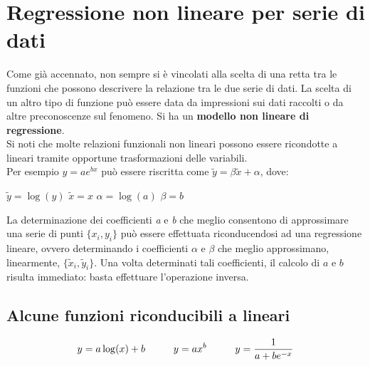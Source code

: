 \section{Regressione non lineare per serie di dati}
Come già accennato, non sempre si è vincolati alla scelta di una retta tra le funzioni che possono descrivere la relazione tra le due serie di dati. La scelta di un altro tipo di funzione può essere data da impressioni sui dati raccolti o da altre preconoscenze sul fenomeno. Si ha un \textbf{modello non lineare di regressione}. \\
Si noti che molte relazioni funzionali non lineari possono essere ricondotte a lineari tramite opportune trasformazioni delle variabili. \\
Per esempio $ y = a e^{bx} $ può essere riscritta come $\tilde{y} = \beta \tilde{x} + \alpha$, dove:
\begin{center}
	$\tilde{y} = \log(y)$ \hspace{10mm} $\tilde{x} = x$ \hspace{10mm} $\alpha = \log(a)$ \hspace{10mm} $\beta = b$ 
\end{center}
La determinazione dei coefficienti \textit{a} e \textit{b} che meglio consentono di approssimare una serie di punti $\{x_i, y_i \}$ può essere effettuata riconducendosi ad una regressione lineare, ovvero determinando i coefficienti $\alpha$ e $\beta$ che meglio approssimano, linearmente,  $\{\tilde{x}_i, \tilde{y}_i \}$. Una volta determinati tali coefficienti, il calcolo di $a$ e $b$ risulta immediato: basta effettuare l'operazione inversa.

\subsection{Alcune funzioni riconducibili a lineari}
\[
y = a\log(x) + b \hspace{10mm} y = ax^b \hspace{10mm} y = \frac{1}{a + be^{-x}}
\]

 
